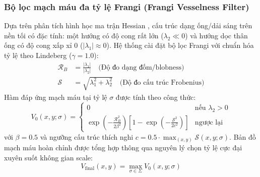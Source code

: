 \documentclass[conference]{IEEEtran}
\begin{document}
\subsubsection{Bộ lọc mạch máu đa tỷ lệ Frangi (Frangi Vesselness Filter)}
Dựa trên phân tích hình học ma trận Hessian \cite{frangi1998multiscale}, cấu trúc dạng ống/dải sáng trên nền tối có đặc tính: một hướng có độ cong rất lớn ($\lambda_2 \ll 0$) và hướng dọc thân ống có độ cong xấp xỉ 0 ($|\lambda_1| \approx 0$).
Hệ thống cài đặt bộ lọc Frangi với chuẩn hóa tỷ lệ theo Lindeberg \cite{lindeberg1998feature} ($\gamma = 1.0$):
\begin{align}
\mathcal{R}_B &= \frac{|\lambda_1|}{|\lambda_2|} \quad \text{(Độ đo dạng đốm/blobness)} \\
\mathcal{S} &= \sqrt{\lambda_1^2 + \lambda_2^2} \quad \text{(Độ đo cấu trúc Frobenius)}
\end{align}
Hàm đáp ứng mạch máu tại tỷ lệ $\sigma$ được tính theo công thức:
\begin{equation}
V_0(x, y; \sigma) = \begin{cases} 
0 & \text{nếu } \lambda_2 > 0 \\
\exp\left(-\frac{\mathcal{R}_B^2}{2\beta^2}\right) \left[ 1 - \exp\left(-\frac{\mathcal{S}^2}{2c^2}\right) \right] & \text{ngược lại}
\end{cases}
\end{equation}
với $\beta = 0.5$ và ngưỡng cấu trúc thích nghi $c = 0.5 \cdot \max_{(x,y)} \mathcal{S}(x, y; \sigma)$.
Bản đồ mạch máu hoàn chỉnh được tổng hợp thông qua nguyên lý chọn tỷ lệ cực đại xuyên suốt không gian scale:
\begin{equation}
V_{\text{final}}(x, y) = \max_{\sigma \in \Sigma} V_0(x, y; \sigma)
\end{equation}
\end{document}
